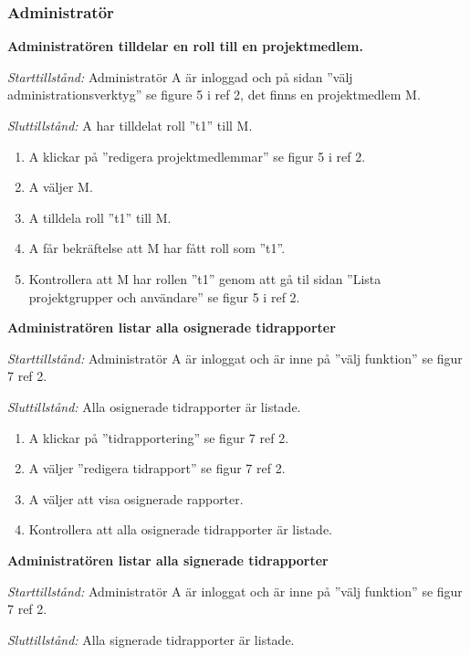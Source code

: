 \documentclass[a4paper]{article}
\begin{document}
\subsubsection{Administratör}
\begin{FT}
\item
\textbf{Administratören tilldelar en roll till en projektmedlem.}

\emph{Starttillstånd:} Administratör A är inloggad och på sidan ''välj administrationsverktyg'' se figure 5 i ref 2, det finns en projektmedlem M.

\emph{Sluttillstånd:} A har tilldelat roll ''t1'' till M.

\begin{enumerate}
\item A klickar på ''redigera projektmedlemmar'' se figur 5 i ref 2.
\item A väljer M.
\item A tilldela roll ''t1'' till M.
\item A får bekräftelse att M har fått roll som ''t1''.
\item Kontrollera att M har rollen ''t1'' genom att gå til sidan ''Lista projektgrupper och användare'' se figur 5 i ref 2.
\end{enumerate}

\item %
\textbf{Administratören listar alla osignerade tidrapporter}

\emph{Starttillstånd:} Administratör A är inloggat och är inne på ''välj funktion'' se figur 7 ref 2.

\emph{Sluttillstånd:} Alla osignerade tidrapporter är listade.

\begin{enumerate}
\item A klickar på ''tidrapportering'' se figur 7 ref 2.
\item A väljer ''redigera tidrapport'' se figur 7 ref 2.
\item A väljer att visa osignerade rapporter.
\item Kontrollera att alla osignerade tidrapporter är listade.
\end{enumerate}

\item %
\textbf{Administratören listar alla signerade tidrapporter}

\emph{Starttillstånd:} Administratör A är inloggat och är inne på ''välj funktion'' se figur 7 ref 2.

\emph{Sluttillstånd:} Alla signerade tidrapporter är listade.


\end{FT}
\end{document}
